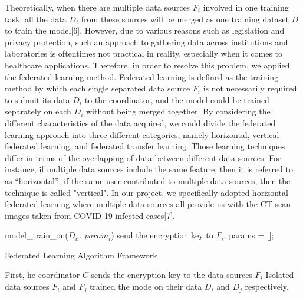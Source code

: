 \documentclass[12pt]{spie}
\begin{document}
Theoretically, when there are multiple data sources $F_{i}$ involved in one training task, all the data $D_{i}$ from these sources will be merged as one training dataset $D$ to train the model[6]. However, due to various reasons such as legislation and privacy protection, such an approach to gathering data across institutions and laboratories is oftentimes not practical in reality, especially when it comes to healthcare applications. Therefore, in order to resolve this problem, we applied the federated learning method. Federated learning is defined as the training method by which each single separated data source $F_{i}$ is not necessarily required to submit its data $D_{i}$ to the coordinator, and the model could be trained separately on each $D_{i}$ without being merged together. By considering the different characteristics of the data acquired, we could divide the federated learning approach into three different categories, namely horizontal, vertical federated learning, and federated transfer learning. Those learning techniques differ in terms of the overlapping of data between different data sources. For instance, if multiple data sources include the same feature, then it is referred to as “horizontal”; if the same user contributed to multiple data sources, then the technique is called "vertical". In our project, we specifically adopted horizontal federated learning where multiple data sources all provide us with the CT scan images taken from COVID-19 infected cases[7]. 
\begin{algorithm}
\DontPrintSemicolon
{}
 {
   {
    model\_train\_on($D_{ii}$, $param_{i}$) \;
  }
}
\BlankLine
{}
 {
}
\BlankLine
{}
 {
   {
    send the encryption key to $F_{i}$;
  }
  params = [];\\
}
\label{algo:1}
\caption{Federated Learning Algorithm Framework}
\end{algorithm}
First, he coordinator $C$ sends the encryption key to the data sources $F_{i}$ Isolated data sources $F_{i}$ and $F_{j}$ trained the mode on their data $D_{i}$ and $D_{j}$ respectively.
\end{document}
